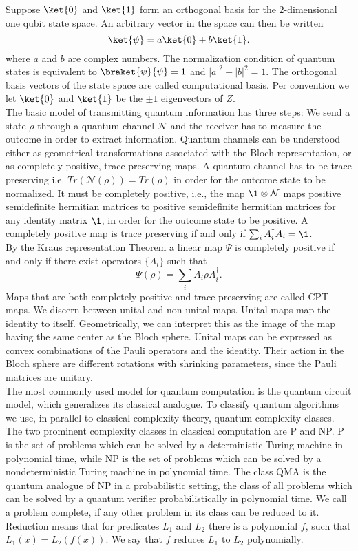 Suppose $\ket{0}$ and $\ket{1}$ form an orthogonal basis for the $2$-dimensional one qubit state space.
An arbitrary vector in the space can then be written \[
\ket{\psi} = a\ket{0}+b\ket{1}
.\]
where $a$ and $b$ are complex numbers.
The normalization condition of quantum states is equivalent to $\braket{\psi}{\psi}=1$ and $ \left| a \right|^2+\left| b \right|^2=1$.
The orthogonal basis vectors of the state space are called computational basis.
Per convention we let $\ket{0}$ and $\ket{1}$ be the $\pm 1$ eigenvectors of $Z$.\\
The basic model of transmitting quantum information has three steps:
We send a state $\rho$ through a quantum channel $\mathcal{N}$ and the receiver has to measure the outcome in order to extract information.
Quantum channels can be understood either as geometrical transformations associated with the Bloch representation, or as completely positive, trace preserving maps.
A quantum channel has to be trace preserving i.e. $Tr(\mathcal{N}(\rho))=Tr(\rho)$ in order for the outcome state to be normalized.
It must be completely positive, i.e., the map $\1\otimes\mathcal{N}$ maps positive semidefinite hermitian matrices to positive semidefinite hermitian matrices for any identity matrix $\1$, in order for the outcome state to be positive.
A completely positive map is trace preserving if and only if $\sum_{i} A_i^{\dagger}A_i = \1$.\\
By the Kraus representation Theorem \cite{choi75} a linear map $\Psi$ is completely positive if and only if there exist operators $ \{A_i\} $ such that \[
\Psi\left(\rho\right)=\sum_{i}A_i\rho A_i^{\dagger}
.\]
Maps that are both completely positive and trace preserving are called CPT maps.
We discern between unital and non-unital maps.
Unital maps map the identity to itself.
Geometrically, we can interpret this as the image of the map having the same center as the Bloch sphere.
Unital maps can be expressed as convex combinations of the Pauli operators and the identity.
Their action in the Bloch sphere are different rotations with shrinking parameters, since the Pauli matrices are unitary.\cite{imre12}\\
The most commonly used model for quantum computation is the quantum circuit model, which generalizes its classical analogue.
To classify quantum algorithms we use, in parallel to classical complexity theory, quantum complexity classes.
The two prominent complexity classes in classical computation are P and NP.
P is the set of problems which can be solved by a deterministic Turing machine in polynomial time, while NP is the set of problems which can be solved by a nondeterministic Turing machine in polynomial time.
The class QMA is the quantum analogue of NP in a probabilistic setting, the class of all problems which can be solved by a quantum verifier probabilistically in polynomial time.\cite{kempe06}
We call a problem complete, if any other problem in its class can be reduced to it.
Reduction means that for predicates $L_1$ and $L_2$ there is a polynomial $f$, such that $L_1(x)=L_2(f(x))$.
We say that $f$ reduces  $L_1$ to $L_2$ polynomially.\\


